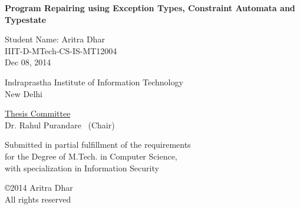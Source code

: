 

\def\addrone{IIIT-Delhi, Okhla Phase 3}
\def\addrtwo{New Delhi, India}

\def\degree{M.Tech. in Computer Science with Specialization in Information Security}


\def\submissiondate{December 08, 2014}

\def\supervisorone{Dr. Rahul Purandare}


%
%
%
%
%
%

\thispagestyle{empty}

\begin{center}

{\LARGE \bf {Program Repairing using Exception Types, Constraint Automata and Typestate}

 }  
 \vspace{.3in}
 
 {\Large{Student Name: Aritra Dhar}} \\  
 \vspace{.1in} 
 IIIT-D-MTech-CS-IS-MT12004 \\

 Dec 08, 2014 \\
  
    \vspace{.35in}

  \vspace{.25in}

{Indraprastha Institute of Information Technology\\
New Delhi}

\vspace{.35in}  {\underline{Thesis Committee}} \\ \supervisorone               
~(Chair)
  \\ \vspace{.35in}


 {Submitted in partial fulfillment of the requirements \\for the Degree of M.Tech. in Computer Science, \\ with specialization in Information Security}

\vspace{1.2in}


\copyright 2014 Aritra Dhar \\ All rights reserved \\
\vspace{.8in}


\end{center}


